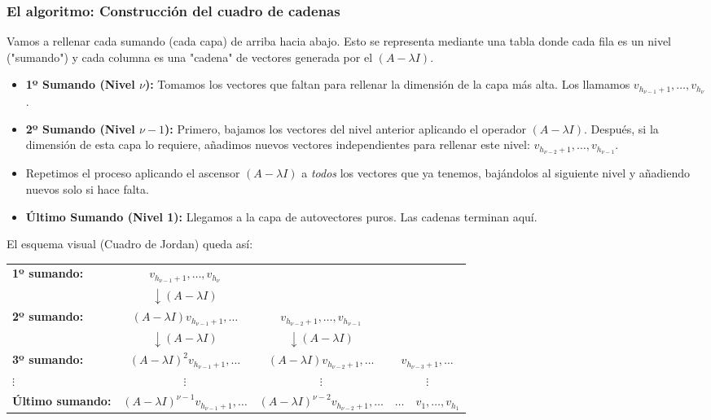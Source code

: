 \subsubsection*{El algoritmo: Construcción del cuadro de cadenas}

Vamos a rellenar cada sumando (cada capa) de arriba hacia abajo. Esto se representa mediante una tabla donde cada fila es un nivel ("sumando") y cada columna es una "cadena" de vectores generada por el $(A-\lambda I)$.

\begin{itemize}
    \item \textbf{1º Sumando (Nivel $\nu$):} Tomamos los vectores que faltan para rellenar la dimensión de la capa más alta. Los llamamos $v_{h_{\nu-1}+1}, \dots, v_{h_\nu}$.
    \item \textbf{2º Sumando (Nivel $\nu-1$):} Primero, bajamos los vectores del nivel anterior aplicando el operador $(A-\lambda I)$. Después, si la dimensión de esta capa lo requiere, añadimos nuevos vectores independientes para rellenar este nivel: $v_{h_{\nu-2}+1}, \dots, v_{h_{\nu-1}}$.
    \item Repetimos el proceso aplicando el ascensor $(A-\lambda I)$ a \textit{todos} los vectores que ya tenemos, bajándolos al siguiente nivel y añadiendo nuevos solo si hace falta.
    \item \textbf{Último Sumando (Nivel 1):} Llegamos a la capa de autovectores puros. Las cadenas terminan aquí.
\end{itemize}

El esquema visual (Cuadro de Jordan) queda así:

\begin{center}
\renewcommand{\arraystretch}{1.8}
\begin{tabular}{l c c c}
\textbf{1º sumando:} & $v_{h_{\nu-1}+1}, \dots, v_{h_\nu}$ & & \\
& $\downarrow \scriptstyle{(A-\lambda I)}$ & & \\
\textbf{2º sumando:} & $(A-\lambda I)v_{h_{\nu-1}+1}, \dots$ & $v_{h_{\nu-2}+1}, \dots, v_{h_{\nu-1}}$ & \\
& $\downarrow \scriptstyle{(A-\lambda I)}$ & $\downarrow \scriptstyle{(A-\lambda I)}$ & \\
\textbf{3º sumando:} & $(A-\lambda I)^2 v_{h_{\nu-1}+1}, \dots$ & $(A-\lambda I)v_{h_{\nu-2}+1}, \dots$ & $v_{h_{\nu-3}+1}, \dots$ \\
$\vdots$ & $\vdots$ & $\vdots$ & $\vdots$ \\
\textbf{Último sumando:} & $(A-\lambda I)^{\nu-1}v_{h_{\nu-1}+1}, \dots$ & $(A-\lambda I)^{\nu-2}v_{h_{\nu-2}+1}, \dots$ & $\dots \quad v_1, \dots, v_{h_1}$
\end{tabular}
\end{center}

